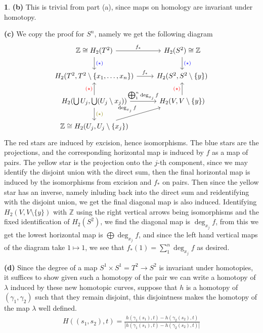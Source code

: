 \documentclass[10.5pt]{article}
\theoremstyle{definition}
\newtheorem{pb}{}
\newcommand{\set}[1]{\{#1\}}
\newcommand{\abs}[1]{\left\vert#1\right\vert}
\begin{document}
\begin{pb}
        \textbf{(b)} This is trivial from part (a), since maps on homology are invariant under homotopy.

        \textbf{(c)} We copy the proof for \(S^n\), namely we get the following diagram
        \begin{equation*}
            \begin{tikzcd}
               \mathbb{Z} \cong H_2(T^2) \arrow[r,"f_*"] \arrow[d,"\textcolor{blue}{(\star)}"] &H_2(S^2) \cong \mathbb{Z} \arrow[d,"\textcolor{blue}{(\star)}"] \\
                H_2(T^2,T^2\setminus\set{x_1,\hdots,x_n}) \arrow[r,"f_*"] & H_2(S^2,S^2\setminus\set{y}) \\
                H_2(\bigcup U_j, \bigcup (U_j\setminus x_j)) \arrow[u,"\textcolor{red}{(\star)}"] \arrow[d,"\textcolor{olive}{(\star)}"] \arrow[r,"\bigoplus_1^n \deg_{x_j} f"] &H_2(V,V\setminus \set{y}) \arrow[u,"\textcolor{red}{(\star)}"] \\
                \mathbb{Z} \cong H_2(U_j, U_j\setminus \set{x_j}) \arrow[ru,"\deg_{x_j} f"]
            \end{tikzcd}
        \end{equation*}
        The red stars are induced by excision, hence isomorphisms. The blue stars are the projections, and the corresponding horizontal map is induced by \(f\) as a map of pairs. The yellow star is the projection onto the \(j\)-th component, since we may identify the disjoint union with the direct sum, then the final horizontal map is induced by the isomorphisms from excision and \(f_*\) on pairs. Then since the yellow star has an inverse, namely inluding back into the direct sum and reidentifying with the disjoint union, we get the final diagonal map is also induced. Identifying \(H_2(V,V\setminus\set{y})\) with \(\mathbb{Z}\) using the right vertical arrows being isomorphisms and the fixed identification of \(H_2(S^2)\), we find the diagonal map is \(\deg_{x_j} f\), from this we get the lowest horizontal map is \(\bigoplus \deg_{x_j} f\), and since the left hand vertical maps of the diagram take \(1 \mapsto 1\), we see that \(f_*(1) = \sum_1^n \deg_{x_j} f\) as desired.

        \textbf{(d)} Since the degree of a map \(S^1 \times S^1 = T^2 \to S^2\) is invariant under homotopies, it suffices to show given such a homotopy of the pair we can write a homotopy of \(\lambda\) induced by these new homotopic curves, suppose that \(h\) is a homotopy of \((\gamma_1, \gamma_2)\) such that they remain disjoint, this disjointness makes the homotopy of the map \(\lambda\) well defined.
        \begin{align*}
            H((s_1,s_2),t) = \frac{h(\gamma_1(s_1),t) - h(\gamma_2(s_2),t)}{\abs{h(\gamma_1(s_1),t) - h(\gamma_2(s_2),t)}}
        \end{align*}


\end{pb}
\end{document}
